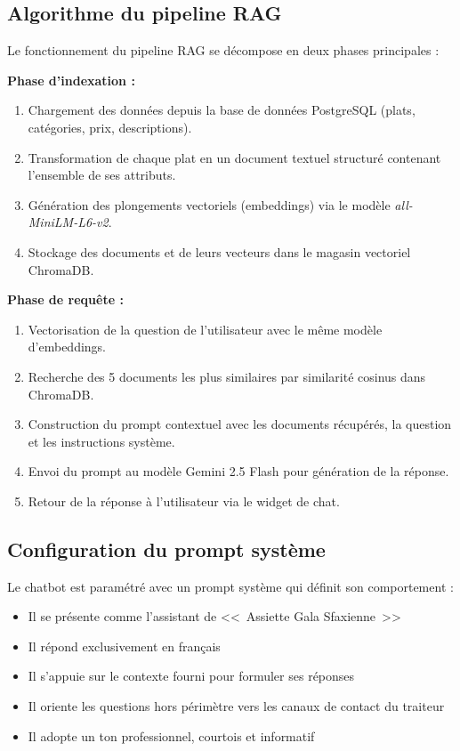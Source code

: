 \subsection{Algorithme du pipeline RAG}

Le fonctionnement du pipeline RAG se décompose en deux phases principales :

\textbf{Phase d'indexation :}
\begin{enumerate}
    \item Chargement des données depuis la base de données PostgreSQL (plats, catégories, prix, descriptions).
    \item Transformation de chaque plat en un document textuel structuré contenant l'ensemble de ses attributs.
    \item Génération des plongements vectoriels (embeddings) via le modèle \textit{all-MiniLM-L6-v2}.
    \item Stockage des documents et de leurs vecteurs dans le magasin vectoriel ChromaDB.
\end{enumerate}

\textbf{Phase de requête :}
\begin{enumerate}
    \item Vectorisation de la question de l'utilisateur avec le même modèle d'embeddings.
    \item Recherche des 5 documents les plus similaires par similarité cosinus dans ChromaDB.
    \item Construction du prompt contextuel avec les documents récupérés, la question et les instructions système.
    \item Envoi du prompt au modèle Gemini 2.5 Flash pour génération de la réponse.
    \item Retour de la réponse à l'utilisateur via le widget de chat.
\end{enumerate}



\subsection{Configuration du prompt système}

Le chatbot est paramétré avec un prompt système qui définit son comportement :

\begin{itemize}
    \item Il se présente comme l'assistant de <<~Assiette Gala Sfaxienne~>>
    \item Il répond exclusivement en français
    \item Il s'appuie sur le contexte fourni pour formuler ses réponses
    \item Il oriente les questions hors périmètre vers les canaux de contact du traiteur
    \item Il adopte un ton professionnel, courtois et informatif
\end{itemize}

